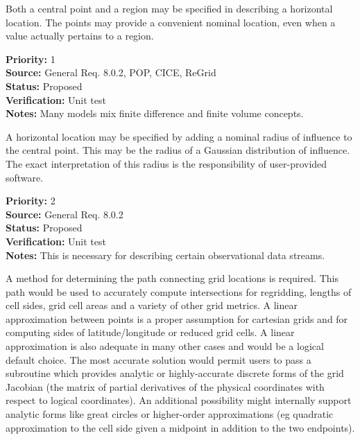 
  Both a central point and a region may be specified in describing a horizontal
location.  The points may provide a convenient nominal location, even when
a value actually pertains to a region.
\begin{reqlist}
{\bf Priority:} 1 \\
{\bf Source:} General Req. 8.0.2, POP, CICE, ReGrid \\
{\bf Status:} Proposed \\
{\bf Verification:} Unit test\\
{\bf Notes:} Many models mix finite difference and finite volume concepts.
\end{reqlist}


  A horizontal location may be specified by adding a nominal radius of
influence to the central point.  This may be the radius of a Gaussian
distribution of influence. The exact interpretation of this radius is
the responsibility of user-provided software.
\begin{reqlist}
{\bf Priority:} 2 \\
{\bf Source:} General Req. 8.0.2 \\
{\bf Status:} Proposed \\
{\bf Verification:} Unit test\\
{\bf Notes:} This is necessary for describing certain observational data streams.
\end{reqlist}



A method for determining the path connecting grid locations 
is required.  This path would be used to accurately compute
intersections for regridding, lengths of cell sides, grid
cell areas and a variety of other grid metrics.  A linear 
approximation between points is a proper assumption for 
cartesian grids and for computing sides of latitude/longitude
or reduced grid cells.  A linear approximation is also 
adequate in many other cases and would be a logical default choice. 
The most accurate solution would permit users to pass a 
subroutine which provides analytic or highly-accurate discrete 
forms of the grid Jacobian (the matrix of partial derivatives of 
the physical coordinates with respect to logical coordinates).  An 
additional possibility might internally support analytic forms like 
great circles or higher-order approximations (eg quadratic
approximation to the cell side given a midpoint in addition
to the two endpoints).

